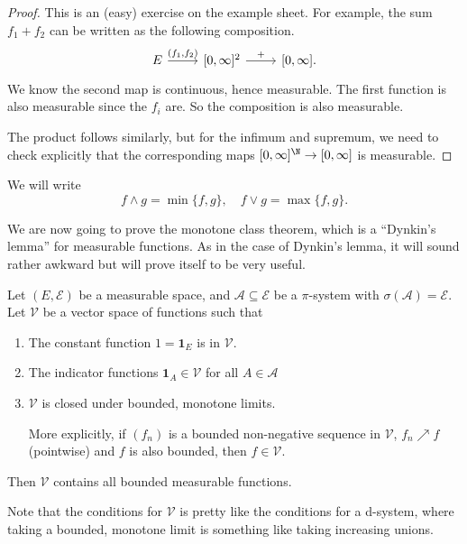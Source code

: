 \documentclass[a4paper]{article}
\begin{document}
\begin{proof}
  This is an (easy) exercise on the example sheet. For example, the sum $f_1 + f_2$ can be written as the following composition.
  \[
    \begin{tikzcd}
      E \ar[r, "{(f_1, f_2)}"] & \lbrack 0, \infty\rbrack^2 \ar[r, "+"] & \lbrack0, \infty\rbrack.
    \end{tikzcd}
  \]
  We know the second map is continuous, hence measurable. The first function is also measurable since the $f_i$ are. So the composition is also measurable.

  The product follows similarly, but for the infimum and supremum, we need to check explicitly that the corresponding maps $[0, \infty]^\N \to [0, \infty]$ is measurable.
\end{proof}

\begin{notation}
  We will write
  \[
    f \wedge g = \min\{f, g\},\quad f \vee g = \max\{f, g\}.
  \]
\end{notation}

We are now going to prove the monotone class theorem, which is a ``Dynkin's lemma'' for measurable functions. As in the case of Dynkin's lemma, it will sound rather awkward but will prove itself to be very useful.
\begin{thm}
  Let $(E, \mathcal{E})$ be a measurable space, and $\mathcal{A} \subseteq \mathcal{E}$ be a $\pi$-system with $\sigma(\mathcal{A}) = \mathcal{E}$. Let $\mathcal{V}$ be a vector space of functions such that
  \begin{enumerate}
    \item The constant function $1 = \mathbf{1}_E$ is in $\mathcal{V}$.
    \item The indicator functions $\mathbf{1}_A \in \mathcal{V}$ for all $A \in \mathcal{A}$
    \item $\mathcal{V}$ is closed under bounded, monotone limits.

      More explicitly, if $(f_n)$ is a bounded non-negative sequence in $\mathcal{V}$, $f_n \nearrow f$ (pointwise) and $f$ is also bounded, then $f \in \mathcal{V}$.
  \end{enumerate}
  Then $\mathcal{V}$ contains all bounded measurable functions.
\end{thm}

Note that the conditions for $\mathcal{V}$ is pretty like the conditions for a d-system, where taking a bounded, monotone limit is something like taking increasing unions.
\end{document}
